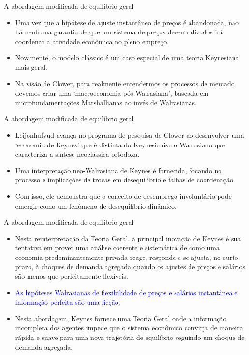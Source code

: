\documentclass[10pt]{beamer}
\begin{document}
\begin{frame}{A abordagem modificada de equilíbrio geral}
    \begin{itemize}
        \item Uma vez que a hipótese de ajuste instantâneo de preços é abandonada, não há nenhuma garantia de que um sistema de preços decentralizados irá coordenar a atividade econômica no pleno emprego.
        \bigskip
        \item Novamente, o modelo clássico é um caso especial de uma teoria Keynesiana mais geral.
        \bigskip
        \item Na visão de Clower, para realmente entendermos os processos de mercado devemos criar uma `macroeconomia pós-Walrasiana', baseada em microfundamentações Marshallianas ao invés de Walrasianas.
    \end{itemize}
\end{frame}

\begin{frame}{A abordagem modificada de equilíbrio geral}
    \begin{itemize}
        \item Leijonhufvud avança no programa de pesquisa de Clower ao desenvolver uma `economia de Keynes' que é distinta do Keynesianismo Walrasiano que caracteriza a síntese neoclássica ortodoxa.
        \bigskip
        \item Uma interpretação neo-Walrasiana de Keynes é fornecida, focando no processo e implicações de trocas em desequilíbrio e falhas de coordenação.
        \bigskip
        \item Com isso, ele demonstra que o conceito de desemprego involuntário pode emergir como um fenômeno de desequilíbrio dinâmico.
    \end{itemize}
\end{frame}

\begin{frame}{A abordagem modificada de equilíbrio geral}
    \begin{itemize}
        \item Nesta reinterpretação da Teoria Geral, a principal inovação de Keynes é sua tentativa em prover uma análise coerente e sistemática de como uma economia predominantemente privada reage, responde e se ajusta, no curto prazo, à choques de demanda agregada quando os ajustes de preços e salários são menos que perfeitamente flexíveis.
        \bigskip
        \item \textcolor{blue}{As hipóteses Walrasianas de flexibilidade de preços e salários instantânea  e informação perfeita são uma ficção}.
        \bigskip
        \item Nesta abordagem, Keynes fornece uma Teoria Geral onde a informação incompleta dos agentes impede que o sistema econômico convirja de maneira rápida e suave para uma nova trajetória de equilíbrio seguindo um choque de demanda agregada.
    \end{itemize}
\end{frame}
\end{document}
